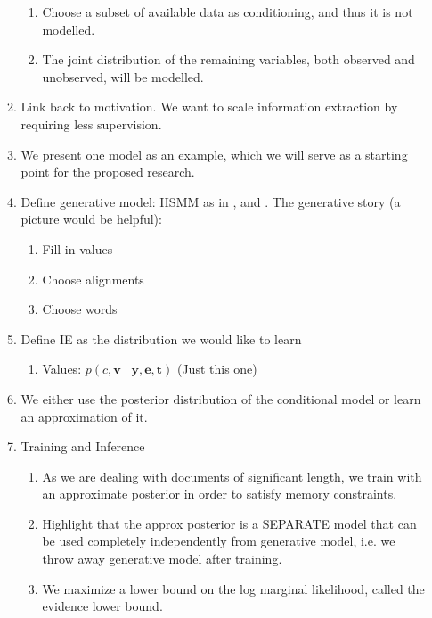 \documentclass[12pt]{article}
\newcommand{\be}{\mathbf{e}}
\newcommand{\br}{\mathbf{r}}
\newcommand{\bt}{\mathbf{t}}
\newcommand{\bv}{\mathbf{v}}
\newcommand{\by}{\mathbf{y}}
\begin{document}
\begin{enumerate}
\begin{enumerate}
\begin{enumerate}
        \item Choose a subset of available data as conditioning,
            and thus it is not modelled.
        \item The joint distribution of the remaining variables,
            both observed and unobserved, will be modelled.
        \end{enumerate}
    \item Link back to motivation. We want to scale information extraction
        by requiring less supervision.
    \item We present one model as an example, which we will serve as
        a starting point for the proposed research.
    \item Define generative model: HSMM as in \citep{liang2009semalign},
        and \citep{wiseman2018template}.
        The generative story (a picture would be helpful):
        \begin{enumerate}
        \item Fill in values
        \item Choose alignments
        \item Choose words
        \end{enumerate}
    \item Define IE as the distribution we would like to learn
        \begin{enumerate}
        \item Values: $p(c,\bv\mid\by,\be,\bt)$ (Just this one)
        \end{enumerate}
    \item We either use the posterior distribution of the conditional model
        or learn an approximation of it.
    \item Training and Inference
        \begin{enumerate}
        \item As we are dealing with documents of significant length,
            we train with an approximate posterior in order to satisfy memory constraints.
        \item Highlight that the approx posterior is a SEPARATE model
            that can be used completely independently from generative model,
            i.e. we throw away generative model after training.
        \item We maximize a lower bound on the log marginal likelihood,
            called the evidence lower bound.

\end{enumerate}
\end{enumerate}
\end{enumerate}
\end{document}
